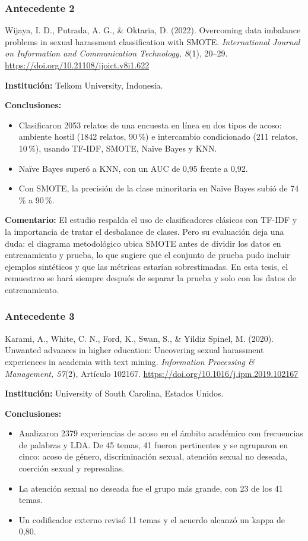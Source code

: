 \subsubsection{Antecedente 2}
\noindent Wijaya, I. D., Putrada, A. G., \& Oktaria, D. (2022). Overcoming data imbalance problems in sexual harassment classification with SMOTE. \textit{International Journal on Information and Communication Technology, 8}(1), 20--29. \url{https://doi.org/10.21108/ijoict.v8i1.622}

\noindent\textbf{Institución:} Telkom University, Indonesia.

\noindent\textbf{Conclusiones:}
\begin{itemize}
	\item Clasificaron 2053 relatos de una encuesta en línea en dos tipos de acoso: ambiente hostil (1842 relatos, 90\,\%) e intercambio condicionado (211 relatos, 10\,\%), usando TF-IDF, SMOTE, Naïve Bayes y KNN.
	\item Naïve Bayes superó a KNN, con un AUC de 0,95 frente a 0,92.
	\item Con SMOTE, la precisión de la clase minoritaria en Naïve Bayes subió de 74\,\% a 90\,\%.
\end{itemize}

\noindent\textbf{Comentario:} El estudio respalda el uso de clasificadores clásicos con TF-IDF y la importancia de tratar el desbalance de clases. Pero su evaluación deja una duda: el diagrama metodológico ubica SMOTE antes de dividir los datos en entrenamiento y prueba, lo que sugiere que el conjunto de prueba pudo incluir ejemplos sintéticos y que las métricas estarían sobrestimadas. En esta tesis, el remuestreo se hará siempre después de separar la prueba y solo con los datos de entrenamiento.

\subsubsection{Antecedente 3}
\noindent Karami, A., White, C. N., Ford, K., Swan, S., \& Yildiz Spinel, M. (2020). Unwanted advances in higher education: Uncovering sexual harassment experiences in academia with text mining. \textit{Information Processing \& Management, 57}(2), Artículo 102167. \url{https://doi.org/10.1016/j.ipm.2019.102167}

\noindent\textbf{Institución:} University of South Carolina, Estados Unidos.

\noindent\textbf{Conclusiones:}
\begin{itemize}
	\item Analizaron 2379 experiencias de acoso en el ámbito académico con frecuencias de palabras y LDA. De 45 temas, 41 fueron pertinentes y se agruparon en cinco: acoso de género, discriminación sexual, atención sexual no deseada, coerción sexual y represalias.
	\item La atención sexual no deseada fue el grupo más grande, con 23 de los 41 temas.
	\item Un codificador externo revisó 11 temas y el acuerdo alcanzó un kappa de 0,80.
\end{itemize}

